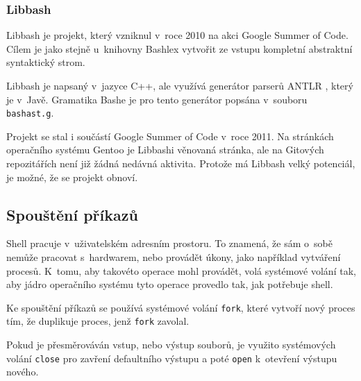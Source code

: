 \documentclass[thesis=M,czech]{FITthesis}[2012/06/26]
\begin{document}

%
%
%
\subsubsection{Libbash}

Libbash \cite{libbash} je projekt, který vzniknul v~roce 2010 na akci Google Summer of Code. Cílem je jako stejně u~knihovny Bashlex vytvořit ze vstupu kompletní abstraktní syntaktický strom.

Libbash je napsaný v~jazyce C++, ale využívá generátor parserů ANTLR \cite{antlr}, který je v~Javě. Gramatika Bashe je pro tento generátor popsána v~souboru \texttt{bashast.g}.

Projekt se stal i součástí Google Summer of Code v~roce 2011. Na stránkách operačního systému Gentoo \cite{gentoolibbash} je Libbashi věnovaná stránka, ale na Gitových repozitářích není již žádná nedávná aktivita. Protože má Libbash velký potenciál, je možné, že se projekt obnoví.





%
%
%
\subsection{Spouštění příkazů}\label{sec:exec}

Shell pracuje v~uživatelském adresním prostoru. To znamená, že sám o~sobě nemůže pracovat s~hardwarem, nebo provádět úkony, jako například vytváření procesů. K~tomu, aby takovéto operace mohl provádět, volá systémové volání tak, aby jádro operačního systému tyto operace provedlo tak, jak potřebuje shell.

Ke spouštění příkazů se používá systémové volání \texttt{fork}, které vytvoří nový proces tím, že duplikuje proces, jenž \texttt{fork} zavolal.

Pokud je přesměrováván vstup, nebo výstup souborů, je využito systémových volání \texttt{close} pro zavření defaultního výstupu a poté \texttt{open} k~otevření výstupu nového.
\end{document}
